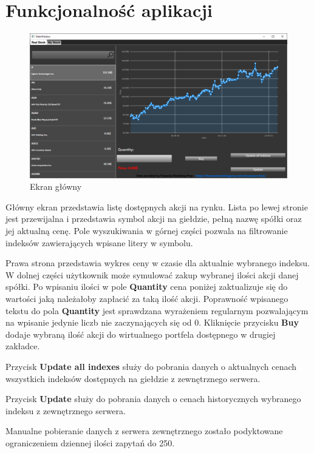 \documentclass{article}
\begin{document}
\section{Funkcjonalność aplikacji}
\begin{figure}[ht]
    \includegraphics[width=\textwidth]{Ekran1.png}
    \caption{Ekran główny}
\end{figure}
\large{
Główny ekran przedstawia listę dostępnych akcji na rynku. Lista po lewej stronie
jest przewijalna i przedstawia symbol akcji na giełdzie, pełną nazwę spółki oraz
jej aktualną cenę. Pole wyszukiwania w górnej części pozwala na filtrowanie indeksów
zawierających wpisane litery w symbolu.

Prawa strona przedstawia wykres ceny w czasie dla aktualnie wybranego indeksu. W
dolnej części użytkownik może symulować zakup wybranej ilości akcji danej
spółki. Po wpisaniu ilości w pole \textbf{Quantity} cena poniżej zaktualizuje się do
wartości jaką należałoby zapłacić za taką ilość akcji. Poprawność wpisanego
tekstu do pola \textbf{Quantity} jest sprawdzana wyrażeniem regularnym pozwalającym na
wpisanie jedynie liczb nie zaczynających się od 0. Kliknięcie przycisku \textbf{Buy}
dodaje wybraną ilość akcji do wirtualnego portfela dostępnego w drugiej
zakładce.

Przycisk \textbf{Update all indexes} służy do pobrania danych o aktualnych
cenach wszystkich indeksów dostępnych na giełdzie z zewnętrznego serwera.

Przycisk \textbf{Update} służy do pobrania danych o cenach historycznych
wybranego indeksu z zewnętrznego serwera.

Manualne pobieranie danych z serwera zewnętrznego zostało podyktowane
ograniczeniem dziennej ilości zapytań do 250.
}
\end{document}
